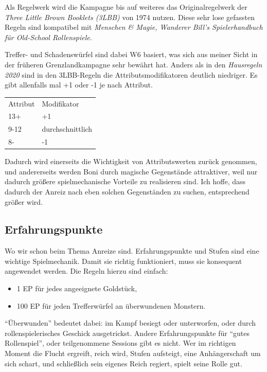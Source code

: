 \documentclass[11pt]{wbzine}
\begin{document}
\begin{multicols}{2}
    Als Regelwerk wird die Kampagne bis auf weiteres das
    Originalregelwerk der \textit{Three Little Brown Booklets
    (3LBB)} von 1974 nutzen.  Diese sehr lose gefassten Regeln sind
    kompatibel mit \textit{Menschen \& Magie, Wanderer Bill's
    Spielerhandbuch für Old-School Rollenspiele}. 

    Treffer- und Schadenswürfel sind dabei W6 basiert, was sich aus
    meiner Sicht in der früheren Grenzlandkampagne sehr bewährt hat.
    Anders als in den \textit{Hausregeln 2020} sind in den
    3LBB-Regeln die Attributsmodifikatoren deutlich niedriger. Es
    gibt allenfalls mal +1 oder -1 je nach Attribut. 

    \begin{tabularx}{\columnwidth}{YY}
	Attribut & Modifikator \\
	13+ & +1 \\
	9-12 & durchschnittlich \\
	8- & -1 \\
    \end{tabularx}

    Dadurch wird einerseits die Wichtigkeit von Attributswerten
    zurück genommen, und andererseits werden Boni durch magische
    Gegenstände attraktiver, weil nur dadurch größere
    spielmechanische Vorteile zu realisieren sind. Ich hoffe, dass
    dadurch der Anreiz nach eben solchen Gegenständen zu suchen,
    entsprechend größer wird.

    \subsection{Erfahrungspunkte}
    \label{xp}

    Wo wir schon beim Thema Anreize sind. Erfahrungspunkte und
    Stufen sind eine wichtige Spielmechanik. Damit sie richtig
    funktioniert, muss sie konsequent angewendet werden. Die Regeln
    hierzu sind einfach: 

    \begin{tcolorbox}
	\begin{itemize}
	    \item 1 EP für jedes angeeignete Goldstück, 

	\item 100 EP für jeden Trefferwürfel an überwundenen
	    Monstern.
	\end{itemize}
    \end{tcolorbox}

    ``Überwunden'' bedeutet dabei: im Kampf besiegt oder
    unterworfen, oder durch rollenspielerisches Geschick
    ausgetrickst. Andere Erfahrungspunkte für ``gutes Rollenspiel'',
    oder teilgenommene Sessions gibt es nicht. Wer im richtigen
    Moment die Flucht ergreift, reich wird, Stufen aufsteigt, eine
    Anhängerschaft um sich schart, und schließlich sein eigenes
    Reich regiert, spielt seine Rolle gut.
    

\end{multicols}
\end{document}
